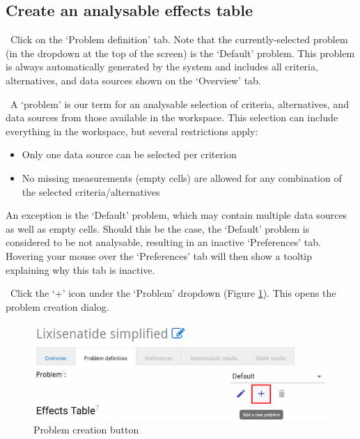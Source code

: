 \documentclass[00_mcda_tutorial.tex]{subfiles}
\begin{document}
\subsection*{Create an analysable effects table}
\leftpointright \, Click on the ‘Problem definition’ tab. Note that the currently-selected problem (in the dropdown at the top of the screen) is the ‘Default’ problem. This problem is always automatically generated by the system and includes all criteria, alternatives, and data sources shown on the ‘Overview’ tab.
\newline

\noindent \faGraduationCap \, A ‘problem’ is our term for an analysable selection of criteria, alternatives, and data sources from those available in the workspace. This selection can include everything in the workspace, but several restrictions apply:

\begin{itemize}
    \item Only one data source can be selected per criterion
    \item No missing measurements (empty cells) are allowed for any combination of the selected criteria/alternatives
\end{itemize}

\noindent An exception is the ‘Default’ problem, which may contain multiple data sources as well as empty cells. Should this be the case, the ‘Default’ problem is considered to be not analysable, resulting in an inactive ‘Preferences’ tab. Hovering your mouse over the ‘Preferences’ tab will then show a tooltip explaining why this tab is inactive.

\noindent \leftpointright \, Click the ‘+’ icon under the ‘Problem’ dropdown (Figure \ref{fig:create_problem}). This opens the problem creation dialog.

\begin{figure}[!h]
    \centering
    \includegraphics[width=.8\textwidth]{fig/createProblem.png}
    \caption{Problem creation button}
    \label{fig:create_problem}
\end{figure}
\end{document}
